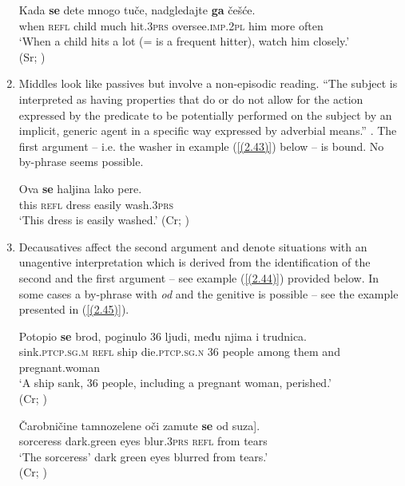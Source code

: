 \begin{enumerate}
\begin{exe}\ex\label{(2.42)}
\gll Kada \textbf{se} dete mnogo  tuče, nadgledajte \textbf{ga}  češće.\\
 when \textsc{refl} child much hit\textsc{.3prs} oversee\textsc{.imp.2pl} him more often\\
\glt ‘When a child hits a lot (= is a frequent hitter), watch him closely.’  \\
\hfill (Sr; \citealt[111]{Moulton15})
\end{exe}

\item Middles look like passives but involve a non-episodic reading. ``The subject is interpreted as having properties that do or do not allow for the action expressed by the predicate to be potentially performed on the subject by an implicit, generic agent in a specific way expressed by adverbial means.'' \citep[227]{FJL10}. The first argument – i.e. the washer in example (\ref{(2.43)}) below – is bound. No by-phrase seems possible.

\begin{exe}\ex\label{(2.43)}
\gll Ova \textbf{se} haljina lako pere.\\
 this \textsc{refl} dress easily wash\textsc{.3prs} \\
\glt ‘This dress is easily washed.’ 
\hfill (Cr; \citealt[214]{Kucanda98})
\end{exe}


\item Decausatives affect the second argument and denote situations with an unagentive interpretation which is derived from the identification of the second and the first argument – see example (\ref{(2.44)}) provided below. In some cases a by-phrase with \textit{od} and the genitive is possible – see the example presented in (\ref{(2.45)}).


\begin{exe}\ex\label{(2.44)}
\gll Potopio \textbf{se} brod, poginulo 36 ljudi, među njima i trudnica. \\
 sink\textsc{.ptcp.sg.m} \textsc{refl} ship die\textsc{.ptcp.sg.n} 36 people among them and pregnant.woman \\
\glt ‘A ship sank, 36 people, including a pregnant woman, perished.’  \\
\hfill (Cr; \citealt[109]{Moulton15})

\ex\label{(2.45)}
\gll Čarobničine tamnozelene oči zamute \textbf{se} \minsp{[} od suza]. \\
 sorceress dark.green eyes blur\textsc{.3prs} \textsc{refl} {} from tears\\
\glt ‘The sorceress’ dark green eyes blurred from tears.’ \\
\hfill (Cr; \citealt[145]{Katicic86})
\end{exe}
\end{enumerate}

